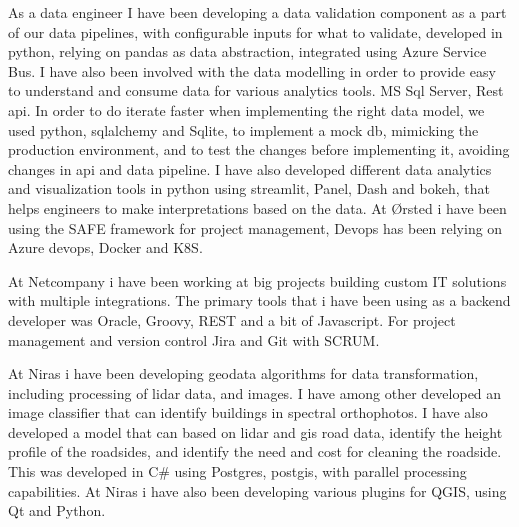 As a data engineer I have been developing a data validation component as a part of our data pipelines, with configurable inputs for what to validate, developed in python, relying on pandas as data abstraction, integrated using Azure Service Bus.
 I have also been involved with the data modelling in order to provide easy to understand and consume data for various analytics tools.
 MS Sql Server, Rest api.
 In order to do iterate faster when implementing the right data model, we used python, sqlalchemy and Sqlite, to implement a mock db, mimicking the production environment, and to test the changes before implementing it, avoiding changes in api and data pipeline.
 I have also developed different data analytics and visualization tools in python using streamlit, Panel, Dash and bokeh, that helps engineers to make interpretations based on the data.
 At Ørsted i have been using the SAFE framework for project management, Devops has been relying on Azure devops, Docker and K8S.

              
\divider

At Netcompany i have been working at big projects building custom IT solutions with multiple integrations.
 The primary tools that i have been using as a backend developer was Oracle, Groovy, REST and a bit of Javascript.
 For project management and version control Jira and Git with SCRUM.

      
\divider

At Niras i have been developing geodata algorithms for data transformation, including processing of lidar data, and images.
 I have among other developed an image classifier that can identify buildings in spectral orthophotos.
 I have also developed a model that can based on lidar and gis road data, identify the height profile of the roadsides, and identify the need and cost for cleaning the roadside.
 This was developed in C\# using Postgres, postgis, with parallel processing capabilities.
 At Niras i have also been developing various plugins for QGIS, using Qt and Python.


